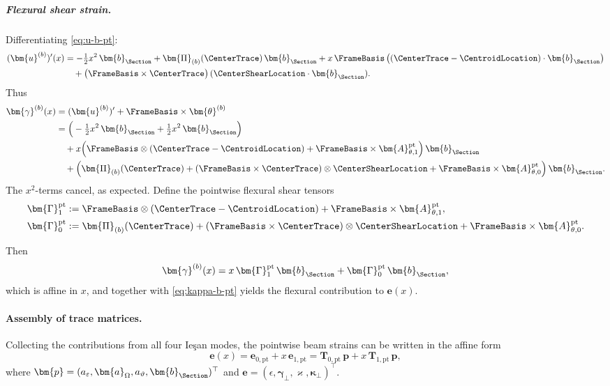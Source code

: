 \subparagraph{Flexural shear strain.}
Differentiating \eqref{eq:u-b-pt}:
\begin{align*}
(\bm{u}^{(b)})'(x)
&=
-\tfrac{1}{2}x^2\,\bm{b}_{\Section}
+ \bm{\Pi}_{(b)}(\CenterTrace)\,\bm{b}_{\Section}
+ x\,\FrameBasis\,\big((\CenterTrace - \CentroidLocation)\cdot\bm{b}_{\Section}\big) \\
&\quad
+ \big(\FrameBasis \times \CenterTrace\big)\,(\CenterShearLocation \cdot \bm{b}_{\Section}).
\end{align*}
Thus
\begin{align*}
\bm{\gamma}^{(b)}(x)
&=
(\bm{u}^{(b)})' + \FrameBasis \times \bm{\theta}^{(b)} \\
&=
\Big(-\tfrac{1}{2}x^2\,\bm{b}_{\Section} 
+ \tfrac{1}{2}x^2\,\bm{b}_{\Section}\Big) \\
&\quad
+ x\Big(\FrameBasis \otimes (\CenterTrace - \CentroidLocation) 
+ \FrameBasis \times \bm{A}_{\theta,1}^{\mathrm{pt}}\Big)\,\bm{b}_{\Section} \\
&\quad
+ \Big(\bm{\Pi}_{(b)}(\CenterTrace) 
+ (\FrameBasis \times \CenterTrace)\otimes \CenterShearLocation 
+ \FrameBasis \times \bm{A}_{\theta,0}^{\mathrm{pt}}\Big)\,\bm{b}_{\Section}.
\end{align*}
The $x^2$-terms cancel, as expected. Define the pointwise flexural shear tensors
\begin{align}
\bm{\Gamma}^{\mathrm{pt}}_1 
&:= \FrameBasis \otimes (\CenterTrace - \CentroidLocation) 
+ \FrameBasis \times \bm{A}_{\theta,1}^{\mathrm{pt}},
\label{eq:def-Gamma1-pt} \\
\bm{\Gamma}^{\mathrm{pt}}_0 
&:= \bm{\Pi}_{(b)}(\CenterTrace) 
+ (\FrameBasis \times \CenterTrace)\otimes \CenterShearLocation 
+ \FrameBasis \times \bm{A}_{\theta,0}^{\mathrm{pt}}.
\label{eq:def-Gamma0-pt}
\end{align}

Then
\begin{equation}
\bm{\gamma}^{(b)}(x)
=
x\,\bm{\Gamma}^{\mathrm{pt}}_1\,\bm{b}_{\Section}
+ \bm{\Gamma}^{\mathrm{pt}}_0\,\bm{b}_{\Section},
\label{eq:gamma-flexure-pt}
\end{equation}
which is affine in $x$, and together with \eqref{eq:kappa-b-pt} yields the 
flexural contribution to $\bm{e}(x)$.

\paragraph{Assembly of trace matrices.}

Collecting the contributions from all four Ieşan modes, the pointwise beam 
strains can be written in the affine form
\begin{equation}
\bm{e}(x)
=
\bm{e}_{0,\mathrm{pt}} + x\,\bm{e}_{1,\mathrm{pt}}
=
\mathbf{T}_{0,\mathrm{pt}}\,\bm{p}
+ x\,\mathbf{T}_{1,\mathrm{pt}}\,\bm{p},
\end{equation}
where $\bm{p} = (a_\varepsilon, \bm{a}_\Omega, a_\vartheta, \bm{b}_{\Section})^\top$ 
and $\bm{e} = (\epsilon, \bm{\gamma}_\perp, \varkappa, \bm{\kappa}_\perp)^\top$.

